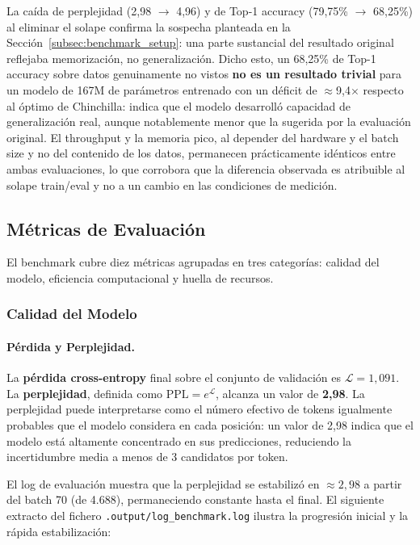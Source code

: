 La caída de perplejidad (2,98 $\to$ 4,96) y de Top-1 accuracy (79,75\% $\to$ 68,25\%) al eliminar el solape confirma la sospecha planteada en la Sección~\ref{subsec:benchmark_setup}: una parte sustancial del resultado original reflejaba memorización, no generalización. Dicho esto, un 68,25\% de Top-1 accuracy sobre datos genuinamente no vistos \textbf{no es un resultado trivial} para un modelo de 167M de parámetros entrenado con un déficit de $\approx$9,4$\times$ respecto al óptimo de Chinchilla: indica que el modelo desarrolló capacidad de generalización real, aunque notablemente menor que la sugerida por la evaluación original. El throughput y la memoria pico, al depender del hardware y el batch size y no del contenido de los datos, permanecen prácticamente idénticos entre ambas evaluaciones, lo que corrobora que la diferencia observada es atribuible al solape train/eval y no a un cambio en las condiciones de medición.

\subsection{Métricas de Evaluación}

El benchmark cubre diez métricas agrupadas en tres categorías: calidad del modelo, eficiencia computacional y huella de recursos.

\subsubsection{Calidad del Modelo}

\paragraph{Pérdida y Perplejidad.}
La \textbf{pérdida cross-entropy} final sobre el conjunto de validación es $\mathcal{L} = 1{,}091$. La \textbf{perplejidad}, definida como $\text{PPL} = e^{\mathcal{L}}$, alcanza un valor de \textbf{2,98}. La perplejidad puede interpretarse como el número efectivo de tokens igualmente probables que el modelo considera en cada posición: un valor de 2,98 indica que el modelo está altamente concentrado en sus predicciones, reduciendo la incertidumbre media a menos de 3 candidatos por token.

El log de evaluación muestra que la perplejidad se estabilizó en $\approx 2{,}98$ a partir del batch 70 (de 4.688), permaneciendo constante hasta el final. El siguiente extracto del fichero \texttt{.output/log\_benchmark.log} ilustra la progresión inicial y la rápida estabilización:

